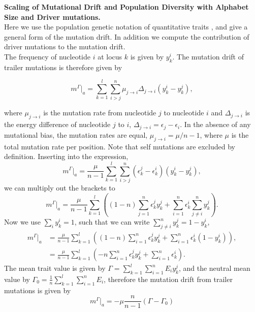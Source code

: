 {\bf Scaling of Mutational Drift and Population Diversity with Alphabet Size and Driver mutations.}\\
Here we use the population genetic notation of quantitative traits \cite{nourmohammad_evolution_2013}, and give a general form of the mutation drift. In addition we compute the contribution of driver mutations to the mutation drift.\\
The frequency of nucleotide $i$ at locus $k$ is given by $y_k^i$. The mutation drift of trailer mutations is therefore given by

\begin{equation}
m^{\Gamma}|_a=\sum_{k=1}^{l}\sum_{i>j}^{n}\mu_{j\rightarrow i}\Delta_{j\rightarrow i}(y_k^i-y_k^j),
\end{equation}

\noindent where $ \mu_{j\rightarrow i}$ is the mutation rate from nucleotide $j$ to nucleotide $i$ and $\Delta_{j\rightarrow i}$ is the energy difference of nucleotide $j$ to $i$, $\Delta_{j\rightarrow i}=\epsilon_j-\epsilon_i$. In the absence of any mutational bias, the mutation rates are equal, $\mu_{j\rightarrow i}=\mu/n-1$, where $\mu$ is the total mutation rate per position. Note that self mutations are excluded by definition. Inserting into the expression,
\begin{equation}
	m^\Gamma|_a=\frac{\mu}{n-1}\sum_{k=1}^{l}\sum_{i>j}^{n}(\epsilon_k^j-\epsilon_k^i)(y_k^i-y_k^j),
\end{equation}
we can multiply out the brackets to
\begin{equation}
		m^\Gamma|_a=\frac{\mu}{n-1}\sum_{k=1}^{l}\left((1-n)\sum_{j=1}^{n}\epsilon_k^jy_k^j+\sum_{i=1}^{n}\epsilon_k^i\sum_{j\neq i}^{n}y_k^j\right).
\end{equation}
Now we use $\sum_{i}y_k^i=1$, such that we can write $\sum_{j\neq i}^{n}y_k^j = 1 - y_k^i$,
\begin{align}
m^{\Gamma}|_a&=\frac{\mu}{n-1}\sum_{k=1}^{l}\left((1-n)\sum_{i=1}^{n}\epsilon_k^jy_k^j+\sum_{i=1}^{n}\epsilon_k^i(1-y_k^i)\right),\nonumber\\
&=\frac{\mu}{n-1}\sum_{k=1}^{l}\left(-n\sum_{i=1}^{n}\epsilon_k^jy_k^j+\sum_{i=1}^{n}\epsilon_k^i\right).
\end{align}
The mean trait value is given by $\Gamma=\sum_{k=1}^l\sum_{i=1}^{n}E_iy_k^j$, and the neutral mean value by $\Gamma_0=\frac{1}{n}\sum_{k=1}^l\sum_{i=1}^nE_i$, therefore the mutation drift from trailer mutations is given by
\begin{equation}
	m^{\Gamma}|_a=-\mu\frac{n}{n-1}\left(\Gamma-\Gamma_0\right)
\end{equation}
